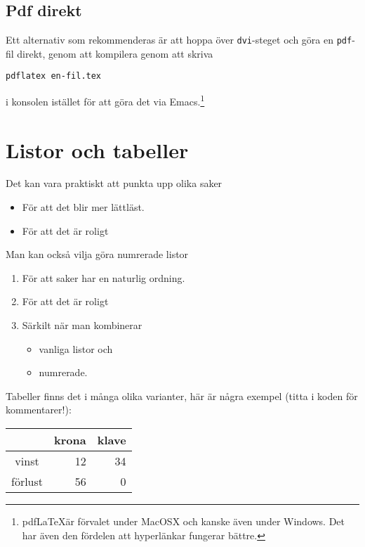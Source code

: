 \documentclass[11pt,a4paper]{article}
\begin{document}
\subsection{Pdf direkt}
Ett alternativ som rekommenderas är att hoppa över \texttt{dvi}-steget och göra en \texttt{pdf}-fil direkt, genom att kompilera genom att skriva
\begin{verbatim}
pdflatex en-fil.tex
\end{verbatim}
i konsolen istället för att göra det via Emacs.\footnote{pdf\LaTeX är förvalet under MacOSX och kanske även under Windows. Det har även den fördelen att hyperlänkar fungerar bättre.}



\section{Listor och tabeller}


Det kan vara praktiskt att punkta upp olika saker
\begin{itemize}
\item För att det blir mer lättläst.
\item För att det är roligt
\end{itemize}
Man kan också vilja göra numrerade listor
\begin{enumerate}
\item För att saker har en naturlig ordning.
\item För att det är roligt
\item Särkilt när man kombinerar
\begin{itemize}
\item vanliga listor och
\item numrerade.
\end{itemize}
\end{enumerate}
Tabeller finns det i många olika varianter, här är några exempel (titta i koden för kommentarer!):

\begin{tabular}{c|r|r}
& krona & klave \\
\hline %
vinst & 12 & 34 \\
förlust & 56 & 0 
\end{tabular}

\bigskip %
\end{document}
